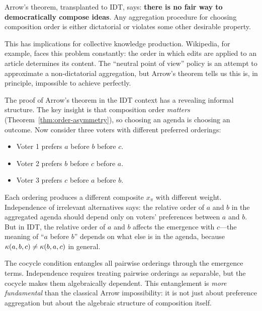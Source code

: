 \begin{interpretation}
\label{interp:democratic-meaning}
Arrow's theorem, transplanted to IDT, says: \textbf{there is no fair way to
democratically compose ideas}.  Any aggregation procedure for choosing
composition order is either dictatorial or violates some other desirable
property.

This has implications for collective knowledge production.  Wikipedia, for
example, faces this problem constantly: the order in which edits are applied
to an article determines its content.  The ``neutral point of view'' policy is
an attempt to approximate a non-dictatorial aggregation, but Arrow's theorem
tells us this is, in principle, impossible to achieve perfectly.
\end{interpretation}

\begin{remark}
\label{rem:arrow-idt-intuition}
The proof of Arrow's theorem in the IDT context has a revealing informal
structure.  The key insight is that composition order \emph{matters}
(Theorem~\ref{thm:order-asymmetry}), so choosing an agenda is choosing an
outcome.  Now consider three voters with different preferred orderings:

\begin{itemize}
  \item Voter 1 prefers $a$ before $b$ before $c$.
  \item Voter 2 prefers $b$ before $c$ before $a$.
  \item Voter 3 prefers $c$ before $a$ before $b$.
\end{itemize}

Each ordering produces a different composite $x_\pi$ with different weight.
Independence of irrelevant alternatives says: the relative order of $a$ and
$b$ in the aggregated agenda should depend only on voters' preferences between
$a$ and $b$.  But in IDT, the relative order of $a$ and $b$ affects the
emergence with $c$---the meaning of ``$a$ before $b$'' depends on what else
is in the agenda, because $\kappa(a, b, c) \neq \kappa(b, a, c)$ in general.

The cocycle condition entangles all pairwise orderings through the emergence
terms.  Independence requires treating pairwise orderings as separable, but
the cocycle makes them algebraically dependent.  This entanglement is
\emph{more fundamental} than the classical Arrow impossibility: it is not
just about preference aggregation but about the algebraic structure of
composition itself.
\end{remark}

